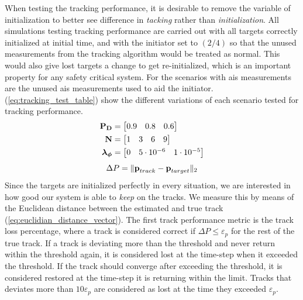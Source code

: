 When testing the tracking performance, it is desirable to remove the variable of initialization to better see difference in \emph{tacking} rather than \emph{initialization}. All simulations testing tracking performance are carried out with all targets correctly initialized at initial time, and with the initiator set to \( (2/4) \) so that the unused measurements from the tracking algorithm would be treated as normal. This would also give lost targets a change to get re-initialized, which is an important property for any safety critical system. For the scenarios with \gls{ais} measurements are the unused \gls{ais} measurements used to aid the initiator. (\ref{eq:tracking_test_table}) show the different variations of each scenario tested for tracking performance. 
\begin{equation}\label{eq:tracking_test_table}
\begin{split}
\boldsymbol{\mathbf{P_D}} &= \begin{bmatrix} 0.9 & 0.8 & 0.6 \end{bmatrix} \\
\boldsymbol{\mathbf{N}} &= \begin{bmatrix} 1 & 3 & 6 & 9 \end{bmatrix} \\
\boldsymbol{\mathbf{\lambda_\phi}} &= \begin{bmatrix} 0 & 5\cdot10^{-6} & 1\cdot10^{-5} \end{bmatrix}
\end{split}
\end{equation}
\begin{equation}
	\Delta P = \| \boldsymbol{\mathbf{p}}_{track}-\boldsymbol{\mathbf{p}}_{target} \|_2
\label{eq:euclidian_distance_vector}
\end{equation}
Since the targets are initialized perfectly in every situation, we are interested in how good our system is able to \emph{keep} on the tracks. We measure this by means of the Euclidean distance between the estimated and true track (\ref{eq:euclidian_distance_vector}). The first track performance metric is the track loss percentage, where a track is considered correct if \(\Delta P \leq \varepsilon_p\) for the rest of the true track. If a track is deviating more than the threshold and never return within the threshold again, it is considered lost at the time-step when it exceeded the threshold. If the track should converge after exceeding the threshold, it is considered restored at the time-step it is returning within the limit. Tracks that deviates more than \(10\varepsilon_p\) are considered as lost at the time they exceeded \(\varepsilon_p\). 

